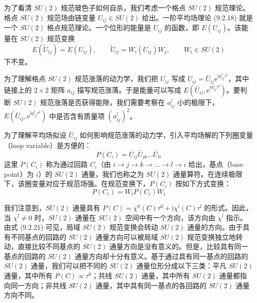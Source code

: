 为了看清 $SU(2)$ 规范玻色子如何自杀，我们考虑一个格点 $SU(2)$ 规范理论。格点 $SU(2)$ 规范场由链变量 $U_{ij}\in SU(2)$ 给出。一阶平均场理论 (9.2.18) 就是一个 $SU(2)$ 格点规范理论。一个位形的能量是 $U_{ij}$ 的函数，即 $E(U_{ij})$。该能量在 $SU(2)$ 规范变换
\begin{equation*}
E(\tilde{U}_{ij})=E(U_{ij}),\qquad \tilde{U}_{ij}=W_i(U_{ij})W_j,\qquad W_i\in SU(2)
\tag{9.2.19}
\end{equation*}
下不变。

为了理解格点 $SU(2)$ 规范涨落的动力学，我们把 $U_{ij}$ 写成 $U_{ij}=\bar{U}_{ij}\mathrm{e}^{\mathrm{i}a_{ij}^{l}\tau^{l}}$，其中链接上的 $2\times 2$ 矩阵 $a_{ij}$ 描写规范涨落。于是能量可以写成 $E(\bar{U}_{ij},\mathrm{e}^{\mathrm{i}a_{ij}^{l}\tau^{l}})$。要判断 $SU(2)$ 规范涨落是否获得能隙，我们需要考察在 $a_{ij}^{l}$ 小的极限下，$E(\bar{U}_{ij},\mathrm{e}^{\mathrm{i}a_{ij}^{l}\tau^{l}})$ 中是否含有质量项 $(a_{ij}^{l})^{2}$。

为了理解平均场拟设 $\bar{U}_{ij}$ 如何影响规范涨落的动力学，引入平均场解的下列圈变量（loop variable）是方便的：
\begin{equation*}
P(C_i)=\bar{U}_{ij}\bar{U}_{jk}\dots\bar{U}_{li}
\tag{9.2.20}
\end{equation*}
这里 $P(C_i)$ 称为通过回路 $C_i$（由 $i\to j\to k\to\dots\to l\to i$ 给出，基点（base point）为 $i$）的 $SU(2)$ 通量，我们也称之为 $SU(2)$ 通量算符。在连续极限下，该圈变量对应于规范场强。在规范变换下，$P(C_i)$ 按如下方式变换：
\begin{equation*}
P(C_i)=W_iP(C_i)W_i
\tag{9.2.21}
\end{equation*}

我们注意到，$SU(2)$ 通量具有 $P(C)=\chi^{0}(C)\tau^{0}+\mathrm{i}\chi^{l}(C)\tau^{l}$ 的形式。因此，当 $\chi^{l}\neq 0$ 时，$SU(2)$ 通量在 $SU(2)$ 空间中有一个方向，该方向由 $\chi^{l}$ 指示。由式 (9.2.21) 可见，局域 $SU(2)$ 规范变换会转动 $SU(2)$ 通量的方向。由于具有不同基点的回路的 $SU(2)$ 通量方向可以被局域 $SU(2)$ 规范变换独立地转动，直接比较不同基点的 $SU(2)$ 通量方向是没有意义的。但是，比较具有同一基点的回路的 $SU(2)$ 通量方向却十分有意义。基于通过具有同一基点的回路的 $SU(2)$ 通量，我们可以把不同的 $SU(2)$ 通量位形分成以下三类：平凡 $SU(2)$ 通量，其中所有 $P(C)\propto\tau^{0}$；共线 $SU(2)$ 通量，其中所有 $SU(2)$ 通量都指向同一方向；非共线 $SU(2)$ 通量，其中具有同一基点的各回路的 $SU(2)$ 通量方向不同。

